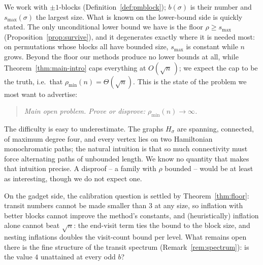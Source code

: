\documentclass[11pt]{article}
\theoremstyle{definition}
\newcommand{\pmin}{\rho_{\min}}
\newcommand{\smax}{s_{\max}}
\begin{document}
We work with $\pm1$-blocks (Definition~\ref{def:pmblock}); $b(\sigma)$ is their
number and $\smax(\sigma)$ the largest size. What is known on the lower-bound
side is quickly stated. The only unconditional lower bound we have is the floor
$\rho \ge \smax$ (Proposition~\ref{prop:survive}), and it degenerates exactly
where it is needed most: on permutations whose blocks all have bounded size,
$\smax$ is constant while $n$ grows. Beyond the floor our methods produce no
lower bounds at all, while Theorem~\ref{thm:main-intro} caps everything at
$O(\sqrt n\,)$; we expect the cap to be the truth, i.e.\ that
$\pmin(n) = \Theta(\sqrt n)$. This is the state of the problem we most want
to advertise:

\begin{quote}
\emph{Main open problem. Prove or disprove: $\pmin(n) \to \infty$.}
\end{quote}

The difficulty is easy to underestimate. The graphs $H_\sigma$ are spanning,
connected, of maximum degree four, and every vertex lies on two Hamiltonian
monochromatic paths; the natural intuition is that so much connectivity must force
alternating paths of unbounded length. We know no quantity that makes that
intuition precise. A disproof -- a family with $\rho$ bounded -- would be at least
as interesting, though we do not expect one.

On the gadget side, the calibration question is settled by
Theorem~\ref{thm:floor}: transit numbers cannot be made smaller than $3$ at any size,
so inflation with better blocks cannot improve the method's constants, and
(heuristically) inflation alone cannot beat $\sqrt n$: the end-visit term ties the
bound to the block size, and nesting inflations doubles the visit-count bound per
level. What remains open there is the fine structure of the transit spectrum
(Remark~\ref{rem:spectrum}): is the value $4$ unattained at every odd $b$?

\end{document}
